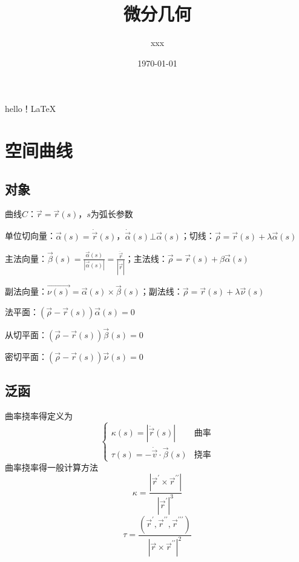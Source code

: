 \documentclass{article}                     %
\title{微分几何}                             %
\author{xxx}
\date{\today}
\numberwithin{equation}{section}            %
\numberwithin{figure}{section}              %
\numberwithin{table}{section}               %
\begin{document}
\maketitle                                  %
hello！LaTeX

\newpage                                    %
\tableofcontents                            %
\newpage                                    %

\section{空间曲线}
\subsection{对象}
曲线$C$：$\vec{r}=\vec{r}(s)$，$s$为弧长参数

单位切向量：$\vec{\alpha }(s)=\dot{\vec{r}} (s)$，$\dot{\vec{\alpha }} (s)\bot \vec{\alpha }(s)$；切线：$\vec{\rho }=\vec{r}(s)+\lambda \vec{\alpha }(s)$

主法向量：$\vec{\beta }(s)=\frac{\vec{\alpha }(s)}{|\vec{\alpha }(s)|}=\frac{\ddot{\vec{r}} }{|\ddot{\vec{r}}|}$；主法线：$\vec{\rho }=\vec{r}(s)+\beta  \vec{\alpha }(s)$

副法向量：$\vec{\nu (s)}=\vec{\alpha }(s)\times \vec{\beta }(s)$；副法线：$\vec{\rho }=\vec{r}(s)+\lambda \vec{\nu }(s)$

法平面：$(\vec{\rho }-\vec{r}(s))\vec{\alpha }(s)=0$

从切平面：$(\vec{\rho }-\vec{r}(s))\vec{\beta }(s)=0$

密切平面：$(\vec{\rho }-\vec{r}(s))\vec{\nu }(s)=0$

\subsection{泛函}
曲率挠率得定义为
\begin{equation*}
    \left\{\begin{matrix}
        \kappa (s)=|\ddot{\vec{r}}(s)|& \mbox{曲率} \\
        \tau (s)=-\dot{\vec{v}}\cdot\vec{\beta }(s)&\mbox{挠率}  
    \end{matrix}\right.
\end{equation*}
曲率挠率得一般计算方法
\begin{equation*}
    \kappa =\frac{|\vec{r}^{\prime}\times \vec{r}^{\prime \prime }|}{|\vec{r}^{\prime}|^{3}}
\end{equation*}
\begin{equation*}
    \tau  =\frac{(\vec{r}^{\prime},\vec{r}^{\prime \prime},\vec{r}^{\prime \prime\prime })}{|\vec{r}\times \vec{r}^{\prime \prime}|^{2}}
\end{equation*}
\end{document}
